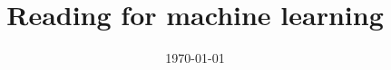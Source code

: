 \documentclass[letterpaper,11pt,reqno]{amsart}
\begin{document}
\title{Reading for machine learning}
\date{\today}
\maketitle

\nocite{*}


\end{document}

